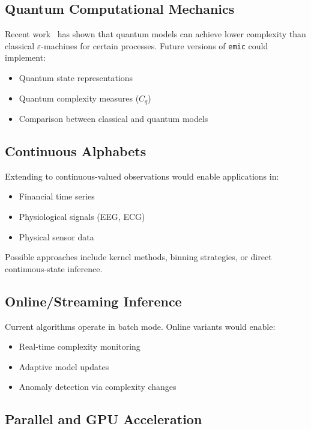 \documentclass[11pt,a4paper]{report}
\theoremstyle{definition}
\theoremstyle{plain}
\newcommand{\eps}{\varepsilon}
\newcommand{\emic}{\texttt{emic}}
\begin{document}
\subsection{Quantum Computational Mechanics}

Recent work~\cite{gu2012quantum,thompson2018causal} has shown that quantum models can achieve lower complexity than classical $\eps$-machines for certain processes. Future versions of \emic{} could implement:

\begin{itemize}
    \item Quantum state representations
    \item Quantum complexity measures ($C_q$)
    \item Comparison between classical and quantum models
\end{itemize}

\subsection{Continuous Alphabets}

Extending to continuous-valued observations would enable applications in:
\begin{itemize}
    \item Financial time series
    \item Physiological signals (EEG, ECG)
    \item Physical sensor data
\end{itemize}

Possible approaches include kernel methods, binning strategies, or direct continuous-state inference.

\subsection{Online/Streaming Inference}

Current algorithms operate in batch mode. Online variants would enable:
\begin{itemize}
    \item Real-time complexity monitoring
    \item Adaptive model updates
    \item Anomaly detection via complexity changes
\end{itemize}

\subsection{Parallel and GPU Acceleration}
\end{document}
